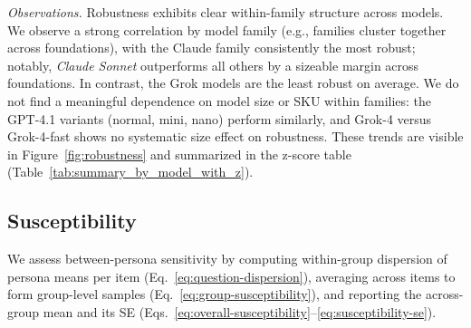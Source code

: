 \documentclass{article}
\begin{document}
\noindent\textit{Observations.} Robustness exhibits clear within-family structure across models. We observe a strong correlation by model family (e.g., families cluster together across foundations), with the Claude family consistently the most robust; notably, \emph{Claude Sonnet} outperforms all others by a sizeable margin across foundations. In contrast, the Grok models are the least robust on average. We do not find a meaningful dependence on model size or SKU within families: the GPT-4.1 variants (normal, mini, nano) perform similarly, and Grok-4 versus Grok-4-fast shows no systematic size effect on robustness. These trends are visible in Figure~\ref{fig:robustness} and summarized in the z-score table (Table~\ref{tab:summary_by_model_with_z}).

\subsection{Susceptibility}
We assess between-persona sensitivity by computing within-group dispersion of persona means per item (Eq.~\ref{eq:question-dispersion}), averaging across items to form group-level samples (Eq.~\ref{eq:group-susceptibility}), and reporting the across-group mean and its SE (Eqs.~\ref{eq:overall-susceptibility}--\ref{eq:susceptibility-se}).
\end{document}
